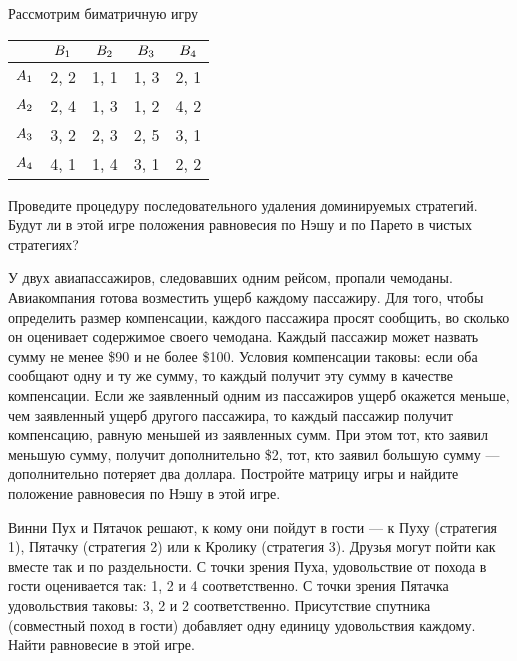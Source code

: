 \begin{exercise}
Рассмотрим биматричную игру
\begin{center}
	\begin{tabular}{|c||c|c|c|c|}
	 \hline
	& $B_{1}$ & $B_{2}$ & $B_{3}$ & $B_{4}$\\ \hline \hline
	$A_1$ & 2, 2 & 1, 1 & 1, 3 & 2, 1\\ \hline
	$A_2$ & 2, 4 & 1, 3 & 1, 2 & 4, 2\\ \hline
	$A_3$ & 3, 2 & 2, 3 & 2, 5 & 3, 1 \\ \hline
	$A_4$ & 4, 1 & 1, 4 & 3, 1 & 2, 2 \\
	\hline
	\end{tabular}
\end{center}
Проведите процедуру последовательного удаления доминируемых стратегий.
Будут ли в этой игре положения равновесия по Нэшу и по Парето в чистых стратегиях?
\end{exercise}

\begin{exercise}
У двух авиапассажиров, следовавших одним рейсом, пропали чемоданы. 
Авиакомпания готова возместить ущерб каждому пассажиру. 
Для того, чтобы определить размер компенсации, каждого пассажира просят сообщить, 
во сколько он оценивает содержимое своего чемодана. 
Каждый пассажир может назвать сумму не менее \$90 и не более \$100. 
Условия компенсации таковы: если оба сообщают одну и ту же сумму, 
то каждый получит эту сумму в качестве компенсации. 
Если же заявленный одним из пассажиров ущерб окажется меньше, 
чем заявленный ущерб другого пассажира, то каждый пассажир получит компенсацию, 
равную меньшей из заявленных сумм. При этом тот, кто заявил меньшую сумму,
получит дополнительно \$2, тот, кто заявил большую сумму — дополнительно потеряет два доллара.
Постройте матрицу игры и найдите положение равновесия по Нэшу в этой игре.
\end{exercise}

\begin{exercise}
Винни Пух и Пятачок решают, к кому они пойдут в гости --- к Пуху
(стратегия 1), Пятачку (стратегия 2) или к Кролику (стратегия 3).
Друзья могут пойти как вместе так и по раздельности. С точки
зрения Пуха, удовольствие от похода в гости оценивается так: 1, 2
и 4 соответственно. С точки зрения Пятачка удовольствия таковы: 3,
2 и 2 соответственно. Присутствие спутника (совместный поход в
гости) добавляет одну единицу удовольствия каждому. Найти
равновесие в этой игре.
\end{exercise}

